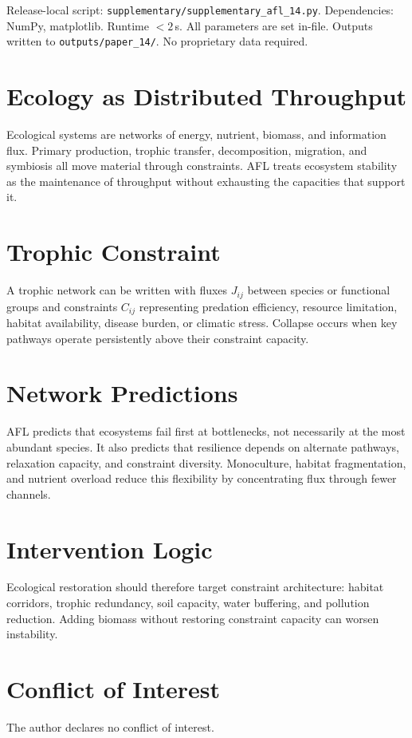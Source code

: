 \documentclass[11pt]{article}
\begin{document}
Release-local script: \texttt{supplementary/supplementary\_afl\_14.py}. Dependencies: NumPy, matplotlib. Runtime $< 2$\,s. All parameters are set in-file. Outputs written to \texttt{outputs/paper\_14/}. No proprietary data required.



\section{Ecology as Distributed Throughput}
Ecological systems are networks of energy, nutrient, biomass, and information flux. Primary production, trophic transfer, decomposition, migration, and symbiosis all move material through constraints. AFL treats ecosystem stability as the maintenance of throughput without exhausting the capacities that support it.

\section{Trophic Constraint}
A trophic network can be written with fluxes $J_{ij}$ between species or functional groups and constraints $C_{ij}$ representing predation efficiency, resource limitation, habitat availability, disease burden, or climatic stress. Collapse occurs when key pathways operate persistently above their constraint capacity.

\section{Network Predictions}
AFL predicts that ecosystems fail first at bottlenecks, not necessarily at the most abundant species. It also predicts that resilience depends on alternate pathways, relaxation capacity, and constraint diversity. Monoculture, habitat fragmentation, and nutrient overload reduce this flexibility by concentrating flux through fewer channels.

\section{Intervention Logic}
Ecological restoration should therefore target constraint architecture: habitat corridors, trophic redundancy, soil capacity, water buffering, and pollution reduction. Adding biomass without restoring constraint capacity can worsen instability.



\section*{Conflict of Interest} The author declares no conflict of interest.
\end{document}
